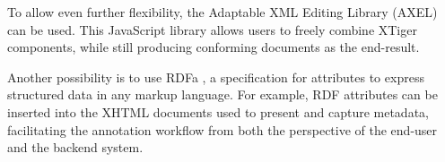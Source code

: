 To allow even further flexibility, the Adaptable XML Editing Library (AXEL)
\cite{ref:axel} can be used. This JavaScript library allows users to freely
combine XTiger components, while still producing conforming documents as the
end-result.

Another possibility is to use RDFa \cite{ref:rdfa}, a specification for
attributes to express structured data in any markup language. For example, RDF
attributes can be inserted into the XHTML documents used to present and capture
metadata, facilitating the annotation workflow from both the perspective of the
end-user and the backend system.
